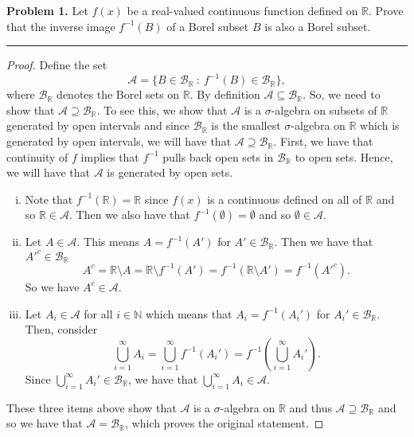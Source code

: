 \documentclass[leqno]{article}
\theoremstyle{nonumberplain}
\newtheorem{proof}{Proof}
\newcommand{\R}{\mathbb{R}}
\newcommand{\N}{\mathbb{N}}
\begin{document}
\pagebreak


\noindent\textbf{Problem 1.} \quad
Let $f(x)$ be a real-valued continuous function defined on $\R$. Prove that the inverse image $f^{-1}(B)$ of a Borel subset $B$ is also a Borel subset.

\noindent\rule[0.5ex]{\linewidth}{1pt}

\begin{proof}
Define the set
\[
\mathcal{A}=\{B\in \mathcal{B}_\R ~\colon ~ f^{-1}(B)\in \mathcal{B}_\R\},
\]
where $\mathcal{B}_\R$ denotes the Borel sets on $\R$.  By definition $\mathcal{A}\subseteq \mathcal{B}_\R$.  So, we need to show that $\mathcal{A}\supseteq \mathcal{B}_\R$. To see this, we show that $\mathcal{A}$ is a $\sigma$-algebra on subsets of $\R$ generated by open intervals and since $\mathcal{B}_\R$ is the smallest $\sigma$-algebra on $\R$ which is generated by open intervals, we will have that $\mathcal{A}\supseteq \mathcal{B}_\R$.  First, we have that continuity of $f$ implies that $f^{-1}$ pulls back open sets in $\mathcal{B}_\R$ to open sets.  Hence, we will have that $\mathcal{A}$ is generated by open sets.
\begin{enumerate}[(i)]
\item Note that $f^{-1}(\R)=\R$ since $f(x)$ is a continuous defined on all of $\R$ and so $\R\in \mathcal{A}$.  Then we also have that $f^{-1}(\emptyset)=\emptyset$ and so $\emptyset \in \mathcal{A}$.
\item Let $A\in \mathcal{A}$. This means $A=f^{-1}(A')$ for $A' \in \mathcal{B}_\R$.  Then we have that $A'^c \in \mathcal{B}_\R$
\[
A^c = \R \setminus A = \R \setminus f^{-1}(A')= f^{-1}(\R\setminus A')=f^{-1}(A'^c).
\]
So we have $A^c\in \mathcal{A}$.
\item Let $A_i\in \mathcal{A}$ for all $i\in \N$ which means that $A_i=f^{-1}(A_i')$ for $A_i'\in \mathcal{B}_\R$. Then, consider
\[
\bigcup_{i=1}^\infty A_i = \bigcup_{i=1}^\infty f^{-1}(A_i') = f^{-1}\left(\bigcup_{i=1}^\infty A_i'\right).
\]
Since $\bigcup_{i=1}^\infty A_i' \in \mathcal{B}_\R$, we have that $\bigcup_{i=1}^\infty A_i \in \mathcal{A}$.  
\end{enumerate}
These three items above show that $\mathcal{A}$ is a $\sigma$-algebra on $\R$ and thus $\mathcal{A}\supseteq \mathcal{B}_\R$ and so we have that $\mathcal{A}=\mathcal{B}_\R$, which proves the original statement.
\end{proof}
\end{document}
